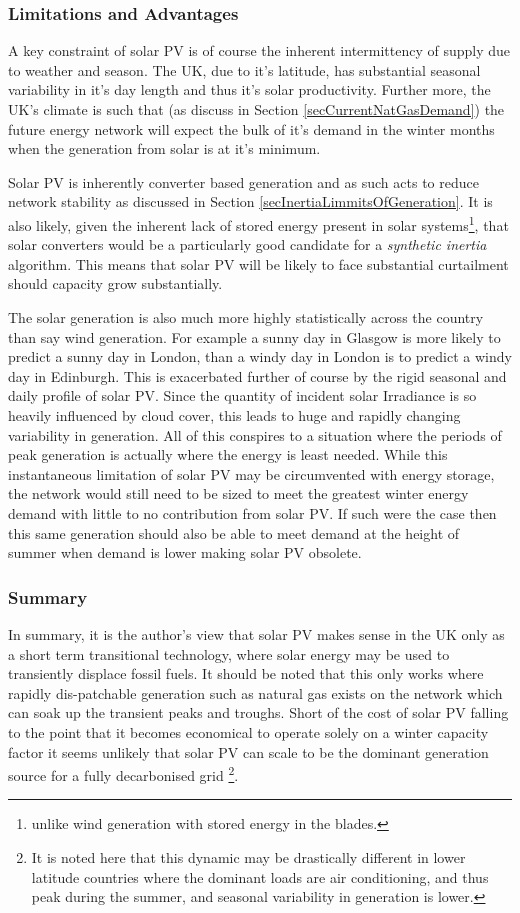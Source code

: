 \documentclass[11pt]{article}
\numberwithin{equation}{section}
\begin{document}
\subsubsection{Limitations and Advantages}
\label{sec:org9601c2b}
A key constraint of solar PV is of course the inherent intermittency of supply due to weather and season. The UK, due to it's latitude, has substantial seasonal variability in it's day length and thus it's solar productivity. Further more, the UK's climate is such that (as discuss in Section \ref{secCurrentNatGasDemand}) the future energy network will expect the bulk of it's demand in the winter months when the generation from solar is at it's minimum.

Solar PV is inherently converter based generation and as such acts to reduce network stability as discussed in Section \ref{secInertiaLimmitsOfGeneration}. It is also likely, given the inherent lack of stored energy present in solar systems\footnote{unlike wind generation with stored energy in the blades.}, that solar converters would be a particularly good candidate for a \emph{synthetic inertia} algorithm. This means that solar PV will be likely to face substantial curtailment should capacity grow substantially.

The solar generation is also much more highly statistically across the country than say wind generation. For example a sunny day in Glasgow is more likely to predict a sunny day in London, than a windy day in London is to predict a windy day in Edinburgh. This is exacerbated further of course by the rigid seasonal and daily profile of solar PV. Since the quantity of incident solar Irradiance is so heavily influenced by cloud cover, this leads to huge and rapidly changing variability in generation. All of this conspires to a situation where the periods of peak generation is actually where the energy is least needed. While this instantaneous limitation of solar PV may be circumvented with energy storage, the network would still need to be sized to meet the greatest winter energy demand with little to no contribution from solar PV. If such were the case then this same generation should also be able to meet demand at the height of summer when demand is lower making solar PV obsolete.

\subsubsection{Summary}
\label{sec:org338aee9}
In summary, it is the author's view that solar PV makes sense in the UK only as a short term transitional technology, where solar energy may be used to transiently displace fossil fuels. It should be noted that this only works where rapidly dis-patchable generation such as natural gas exists on the network which can soak up the transient peaks and troughs.  Short of the cost of solar PV falling to the point that it becomes economical to operate solely on a winter capacity factor it seems unlikely that solar PV can scale to be the dominant generation source for a fully decarbonised grid \footnote{It is noted here that this dynamic may be drastically different in lower latitude countries where the dominant loads are air conditioning, and thus peak during the summer, and seasonal variability in generation is lower.}.
\end{document}
